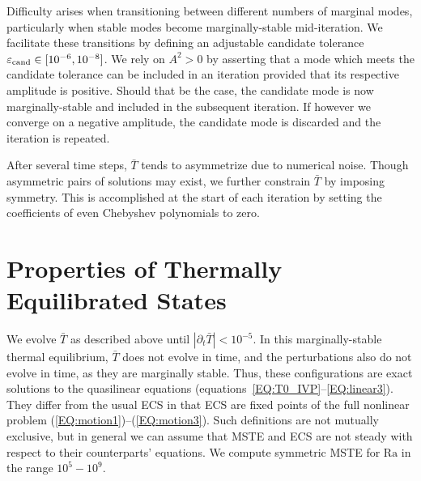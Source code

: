 \documentclass[reprint,amsmath,amssymb,aps]{revtex4-1}
\newcommand\Ra{\mathrm{Ra}}
\newcommand{\eqss}[2]{(\ref{#1})--(\ref{#2})}
\begin{document}
Difficulty arises when transitioning between different numbers of marginal modes, particularly when stable modes become marginally-stable mid-iteration.
We facilitate these transitions by defining an adjustable candidate tolerance $\varepsilon_{\rm{cand}} \in [10^{-6}, 10^{-8}]$.
We rely on $A^2 > 0$ by asserting that a mode which meets the candidate tolerance can be included in an iteration provided that its respective amplitude is positive.
Should that be the case, the candidate mode is now marginally-stable and included in the subsequent iteration.
If however we converge on a negative amplitude, the candidate mode is discarded and the iteration is repeated. 

After several time steps, $\bar{T}$ tends to asymmetrize due to numerical noise. 
Though asymmetric pairs of solutions may exist, we further constrain $\bar{T}$ by imposing symmetry. 
This is accomplished at the start of each iteration by setting the coefficients of even Chebyshev polynomials to zero.

\section{Properties of Thermally Equilibrated States}\label{sec:properties}
We evolve $\bar{T}$ as described above until $|\partial_{t}\bar{T}| < 10^{-5}$.
In this marginally-stable thermal equilibrium, $\bar{T}$ does not evolve in time, and the perturbations also do not evolve in time, as they are marginally stable.
Thus, these configurations are exact solutions to the quasilinear equations (equations~\ref{EQ:T0_IVP}--\ref{EQ:linear3}).
They differ from the usual ECS in that ECS are fixed points of the full nonlinear problem \eqss{EQ:motion1}{EQ:motion3}. 
Such definitions are not mutually exclusive, but in general we can assume that MSTE and ECS are not steady with respect to their counterparts' equations.
We compute symmetric MSTE for $\Ra$ in the range $10^5 - 10^9$.
\end{document}

